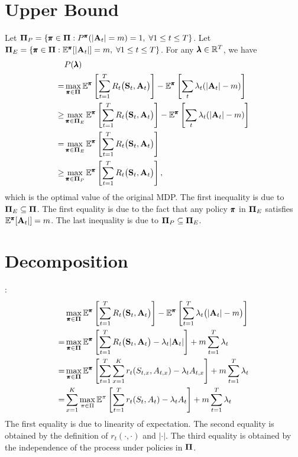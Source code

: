 \section{Upper Bound}\label{ap:up}
Let $\mathbf{\Pi}_P = \{\pmb{\pi}\in\mathbf{\Pi}: P^{\pmb{\pi}}(|\mathbf{A}_t|=m)=1,\;\forall 1\leq t\leq T\}$. Let $\mathbf{\Pi}_E = \{\pmb{\pi}\in\mathbf{\Pi}:\mathbb{E}^{\pmb{\pi}}[|\mathbf{A}_t|]=m,\;\forall 1\leq t\leq T\}$. For any $\pmb{\lambda}\in\mathbb{R}^{T}$, we have
\begin{align*}
& P(\pmb{\lambda})\\
 =& \max_{\pmb{\pi}\in \mathbf{\Pi}}\mathbb{E}^{\pmb{\pi}}\left[\sum_{t=1}^{T}R_t\big(\mathbf{S}_t,\mathbf{A}_t\big)\right]-\mathbb{E}^{\pmb{\pi}}\left[\sum_{t}\lambda_t(|\mathbf{A}_t|-m) \right] \\
\geq & \max_{\pmb{\pi}\in \mathbf{\Pi}_E}\mathbb{E}^{\pmb{\pi}}\left[\sum_{t=1}^{T}R_t\big(\mathbf{S}_t,\mathbf{A}_t\big)\right]-\mathbb{E}^{\pmb{\pi}}\left[\sum_{t}\lambda_t(|\mathbf{A}_t|-m) \right] \\
= & \max_{\pmb{\pi}\in \mathbf{\Pi}_E}\mathbb{E}^{\pmb{\pi}}\left[\sum_{t=1}^{T}R_t\big(\mathbf{S}_t,\mathbf{A}_t\big)\right]\\
\geq & \max_{\pmb{\pi}\in \mathbf{\Pi}_P}\mathbb{E}^{\pmb{\pi}}\left[\sum_{t=1}^{T}R_t\big(\mathbf{S}_t,\mathbf{A}_t\big)\right],
\end{align*}
which is the optimal value of the original MDP. The first inequality is due to $\mathbf{\Pi}_E\subseteq\mathbf{\Pi}$. The first equality is due to the fact that any policy $\pmb{\pi}$ in $\mathbf{\Pi}_E$ satisfies $\mathbb{E}^{\pmb{\pi}}[\mathbf{A}_t|]=m$. The last inequality is due to $\mathbf{\Pi}_P\subseteq\mathbf{\Pi}_E$.
\endproof
\section{Decomposition}\label{ap:decom}
: 
\begin{align*}
 & \max_{\pmb{\pi}\in \mathbf{\Pi}}\mathbb{E}^{\pmb{\pi}}\left[\sum_{t=1}^{T}R_t\big(\mathbf{S}_t,\mathbf{A}_t\big)\right]-\mathbb{E}^{\pmb{\pi}}\left[\sum_{t=1}^T\lambda_t\big(|\mathbf{A}_t|-m\big)\right] \\
 =& \max_{\pmb{\pi}\in \mathbf{\Pi}}\mathbb{E}^{\pmb{\pi}}\left[\sum_{t=1}^{T}R_t\big(\mathbf{S}_t,\mathbf{A}_t\big)-\lambda_t|\mathbf{A}_t|\right] + m\sum_{t=1}^{T}\lambda_t\\
  =& \max_{\pmb{\pi}\in \mathbf{\Pi}}\mathbb{E}^{\pmb{\pi}}\left[\sum_{t=1}^{T}\sum_{x=1}^{K}r_t(S_{t,x},A_{t,x})-\lambda_tA_{t,x}\right] + m\sum_{t=1}^{T}\lambda_t \\
 =&\sum_{x=1}^{K}\max_{\pi\in \Pi}\mathbb{E}^{\pi}\left[\sum_{t=1}^{T}r_t(S_{t},A_{t})-\lambda_tA_{t}\right] + m\sum_{t=1}^{T}\lambda_t \\
\end{align*}
\endproof
The first equality is due to linearity of expectation. The second equality is obtained by the definition of $r_t(\cdot,\cdot)$ and $|\cdot|$. The third equality is obtained by the independence of the process under policies in $\mathbf{\Pi}$. 
